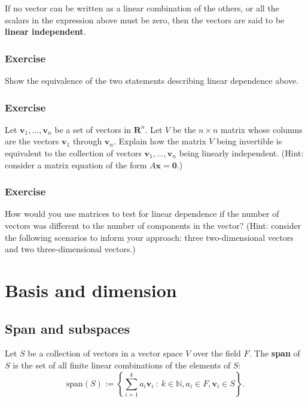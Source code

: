 \documentclass[a4paper,12pt]{amsart}
\begin{document}
    If no vector can be written as a linear combination of the others, or all the scalars in the expression above must be zero, then the vectors are said to be \textbf{linear independent}.

    \subsubsection{Exercise} Show the equivalence of the two statements describing linear dependence above.

    \subsubsection{Exercise} Let $\mathbf{v}_1, \ldots, \mathbf{v}_n$ be a set of vectors in $\mathbf{R}^n$. Let $V$ be the $n \times n$ matrix whose columns are the vectors $\mathbf{v}_1$ through $\mathbf{v}_n$. Explain how the matrix $V$ being invertible is equivalent to the collection of vectors $\mathbf{v}_1, \ldots, \mathbf{v}_n$ being linearly independent. (Hint: consider a matrix equation of the form $A\mathbf{x} = \mathbf{0}$.)

    \subsubsection{Exercise} How would you use matrices to test for linear dependence if the number of vectors was different to the number of components in the vector? (Hint: consider the following scenarios to inform your approach: three two-dimensional vectors and two three-dimensional vectors.)

    \section{Basis and dimension}

    \subsection{Span and subspaces} Let $S$ be a collection of vectors in a vector space $V$ over the field $F$. The \textbf{span} of $S$ is the set of all finite linear combinations of the elements of $S$:
    \[ \mathrm{span} (S) := \left\{ \sum_{i=1}^k a_i \mathbf{v}_i \: : \: k \in \mathbb{N}, a_i \in F, \mathbf{v}_i \in S \right \}. \]
    
\end{document}
